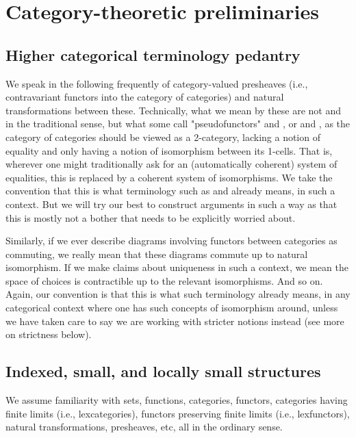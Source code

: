 \section{Category-theoretic preliminaries}

\subsection{Higher categorical terminology pedantry}
We speak in the following frequently of category-valued presheaves (i.e., contravariant functors into the category of categories) and natural transformations between these. Technically, what we mean by these are not  and  in the traditional sense, but what some call "pseudofunctors" and , or  and , as the category of categories should be viewed as a 2-category, lacking a notion of equality and only having a notion of isomorphism between its 1-cells. That is, wherever one might traditionally ask for an (automatically coherent) system of equalities, this is replaced by a coherent system of isomorphisms. We take the convention that this is what terminology such as  and  already means, in such a context. But we will try our best to construct arguments in such a way as that this is mostly not a bother that needs to be explicitly worried about.

Similarly, if we ever describe diagrams involving functors between categories as commuting, we really mean that these diagrams commute up to natural isomorphism. If we make claims about uniqueness in such a context, we mean the space of choices is contractible up to the relevant isomorphisms. And so on. Again, our convention is that this is what such terminology already means, in any categorical context where one has such concepts of isomorphism around, unless we have taken care to say we are working with stricter notions instead (see more on strictness below).

\subsection{Indexed, small, and locally small structures}
We assume familiarity with sets, functions, categories, functors, categories having finite limits (i.e., lexcategories), functors preserving finite limits (i.e., lexfunctors), natural transformations, presheaves, etc, all in the ordinary sense.

